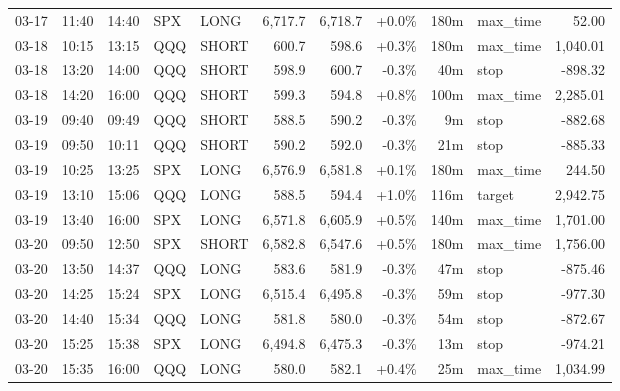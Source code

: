 \documentclass[11pt,a4paper,twoside]{article}
\begin{document}
\begin{center}
\begin{longtable}{>{\color{txtmain}}l l l l l r r r r >{\color{txtmain}}l r}
03-17 & 11:40 & 14:40 & SPX & LONG & 6,717.7 & 6,718.7 & \textcolor{wingreen}{+0.0\%} & 180m & max\_time & \textcolor{wingreen}{52.00} \\
03-18 & 10:15 & 13:15 & QQQ & SHORT & 600.7 & 598.6 & \textcolor{wingreen}{+0.3\%} & 180m & max\_time & \textcolor{wingreen}{1,040.01} \\
03-18 & 13:20 & 14:00 & QQQ & SHORT & 598.9 & 600.7 & \textcolor{lossred}{-0.3\%} & 40m & stop & \textcolor{lossred}{-898.32} \\
03-18 & 14:20 & 16:00 & QQQ & SHORT & 599.3 & 594.8 & \textcolor{wingreen}{+0.8\%} & 100m & max\_time & \textcolor{wingreen}{2,285.01} \\
03-19 & 09:40 & 09:49 & QQQ & SHORT & 588.5 & 590.2 & \textcolor{lossred}{-0.3\%} & 9m & stop & \textcolor{lossred}{-882.68} \\
03-19 & 09:50 & 10:11 & QQQ & SHORT & 590.2 & 592.0 & \textcolor{lossred}{-0.3\%} & 21m & stop & \textcolor{lossred}{-885.33} \\
03-19 & 10:25 & 13:25 & SPX & LONG & 6,576.9 & 6,581.8 & \textcolor{wingreen}{+0.1\%} & 180m & max\_time & \textcolor{wingreen}{244.50} \\
03-19 & 13:10 & 15:06 & QQQ & LONG & 588.5 & 594.4 & \textcolor{wingreen}{+1.0\%} & 116m & target & \textcolor{wingreen}{2,942.75} \\
03-19 & 13:40 & 16:00 & SPX & LONG & 6,571.8 & 6,605.9 & \textcolor{wingreen}{+0.5\%} & 140m & max\_time & \textcolor{wingreen}{1,701.00} \\
03-20 & 09:50 & 12:50 & SPX & SHORT & 6,582.8 & 6,547.6 & \textcolor{wingreen}{+0.5\%} & 180m & max\_time & \textcolor{wingreen}{1,756.00} \\
03-20 & 13:50 & 14:37 & QQQ & LONG & 583.6 & 581.9 & \textcolor{lossred}{-0.3\%} & 47m & stop & \textcolor{lossred}{-875.46} \\
03-20 & 14:25 & 15:24 & SPX & LONG & 6,515.4 & 6,495.8 & \textcolor{lossred}{-0.3\%} & 59m & stop & \textcolor{lossred}{-977.30} \\
03-20 & 14:40 & 15:34 & QQQ & LONG & 581.8 & 580.0 & \textcolor{lossred}{-0.3\%} & 54m & stop & \textcolor{lossred}{-872.67} \\
03-20 & 15:25 & 15:38 & SPX & LONG & 6,494.8 & 6,475.3 & \textcolor{lossred}{-0.3\%} & 13m & stop & \textcolor{lossred}{-974.21} \\
03-20 & 15:35 & 16:00 & QQQ & LONG & 580.0 & 582.1 & \textcolor{wingreen}{+0.4\%} & 25m & max\_time & \textcolor{wingreen}{1,034.99} \\
\end{longtable}
\end{center}
\clearpage
\end{document}
